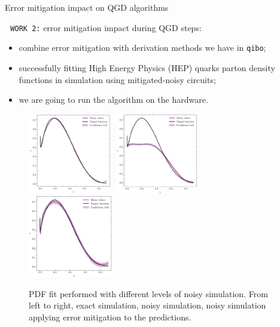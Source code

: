 \documentclass[8pt, xcolor={svgnames}, hyperref={colorlinks,linkcolor=black, citecolor=black, urlcolor=black}]{beamer}
\begin{document}
\begin{frame}{Error mitigation impact on QGD algorithms}


\faTerminal\,\, \texttt{WORK 2:} error mitigation impact during QGD steps:
\begin{itemize}[noitemsep]
    \item[\tiny\faSquare] combine error mitigation with derivation methods we 
    have in \texttt{qibo};
    \item[\tiny\faSquare] successfully fitting High Energy Physics (HEP) quarks parton
    density functions in simulation
    using mitigated-noisy circuits;
    \item[\tiny\faSquare] we are going to run the algorithm on the hardware.
\end{itemize}

\begin{figure}
    \includegraphics[height=3.5cm, width=0.33\textwidth]{figures/exact.pdf}%
    \includegraphics[height=3.5cm, width=0.33\textwidth]{figures/noisy.pdf}%
    \includegraphics[height=3.5 cm, width=0.33\textwidth]{figures/mitigated.pdf}%
    \caption{PDF fit performed with different levels of noisy simulation. 
    From left to right, exact simulation, noisy simulation, noisy simulation 
    applying error mitigation to the predictions.}
    \label{fig:mitigated_fit}
\end{figure}


\end{frame}
\end{document}

